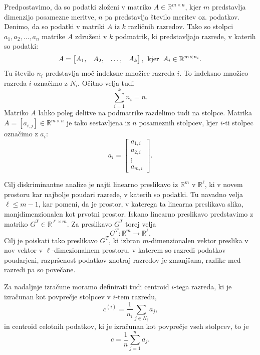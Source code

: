 \documentclass[mat1]{article}
\theoremstyle{definition}
\begin{document}
Predpostavimo, da so podatki zloženi v matriko $A \in \mathbb{R}^{m \times n}$, kjer $m$ predstavlja dimenzijo posamezne meritve, $n$ pa predstavlja število meritev oz. podatkov. Denimo, da so podatki v matriki $A$ iz $k$ različnih razredov. Tako so stolpci $a_1, a_2, \ldots, a_n$ matrike $A$ združeni v $k$ podmatrik, ki predstavljajo razrede, v katerih so podatki:
$$ A = 
\begin{bmatrix}
A_1, & A_2, & \ldots, & A_k
\end{bmatrix} \text{,}
\hspace{2mm} \text{kjer} \hspace{2mm} A_i \in \mathbb{R}^{m \times n_i} \text{.}
$$ 
Tu število $n_i$ predstavlja moč indeksne množice razreda $i$. To indeksno množico razreda $i$ označimo z $N_i$. Očitno velja tudi $$
\sum_{i=1}^{k}n_i = n \text{.}$$
Matriko $A$ lahko poleg delitve na podmatrike razdelimo tudi na stolpce. Matrika $A = \left[ a_{i ,j} \right]  \in \mathbb{R}^{m \times n}$ je tako sestavljena iz $n$ posameznih stolpcev, kjer $i$-ti stolpec označimo z $a_i$:
$$ a_i =
\begin{bmatrix}
a_{1, i} \\
a_{2, i} \\
\vdots \\
a_{m, i}
\end{bmatrix}
\text{.}
$$

Cilj diskriminantne analize je najti linearno preslikavo iz $\mathbb{R}^m$ v $\mathbb{R}^\ell$, ki v novem prostoru kar najbolje poudari razrede, v katerih so podatki. Tu navadno velja $\ell \leq m - 1$, kar pomeni, da je prostor, v katerega ta linearna preslikava slika, manjdimenzionalen kot prvotni prostor. Iskano linearno preslikavo predstavimo z matriko $G^T \in \mathbb{R}^{\ell \times m}$.
Za preslikavo $G^T$ torej velja $$G^T : \mathbb{R}^m \rightarrow \mathbb{R}^\ell \text{.}$$ 
Cilj je poiskati tako preslikavo $G^T$, ki izbran $m$-dimenzionalen vektor preslika v nov vektor v $\ell$-dimezionalnem prostoru, v katerem so razredi podatkov poudarjeni, razpršenost podatkov znotraj razredov je zmanjšana, razlike med razredi pa so povečane.

Za nadaljnje izračune moramo definirati tudi centroid $i$-tega razreda, ki je izračunan kot povprečje stolpcev v $i$-tem razredu, 
$$c^{(i)} = \frac{1}{n_i} \sum_{j \in N_i} a_j \text{,}
$$
in centroid celotnih podatkov, ki je izračunan kot povprečje vseh stolpcev, to je
$$c = \frac{1}{n} \sum_{j = 1}^{n} a_j \text{.}
$$
\end{document}
